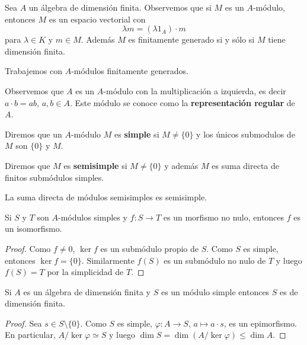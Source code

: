 Sea $A$ un álgebra de dimensión finita. Observemos
que si $M$ es un $A$-módulo, entonces $M$ es un espacio vectorial con 
\[
\lambda m=(\lambda 1_A)\cdot m
\]
para
$\lambda\in K$ y $m\in M$. 
Además $M$ es finitamente generado si y sólo si $M$ tiene dimensión finita. 

Trabajemos con $A$-módulos finitamente generados. 

Observemos que $A$ es un $A$-módulo con la multiplicación a izquierda, es decir $a\cdot b=ab$, $a,b\in A$.
Este módulo se conoce como la \textbf{representación regular} de $A$. 

\begin{definition}
Diremos que un $A$-módulo $M$ es
\textbf{simple} si $M\ne\{0\}$ y los únicos submodulos de $M$ son $\{0\}$ y $M$. 
\end{definition}

\begin{definition}
Diremos que $M$ es \textbf{semisimple} si $M\ne\{0\}$ y además $M$
es suma directa de finitos submódulos simples. 
\end{definition}

La suma directa de módulos semisimples es semisimple. 

\begin{lemma}[Schur]
Si $S$ y $T$ son $A$-módulos simples y $f\colon S\to T$ es un morfismo no nulo, entonces
$f$ es un isomorfismo. 	
\end{lemma}

\begin{proof}
Como $f\ne 0$, $\ker f$ es un submódulo propio de $S$. Como $S$ es simple, entonces $\ker f=\{0\}$. Similarmente $f(S)$ 
es un submódulo no nulo de $T$ y luego $f(S)=T$ por la simplicidad de $T$. 	
\end{proof}

\begin{proposition}
    Si $A$ es un álgebra de dimensión finita y $S$ es un módulo simple 
    entonces $S$ es de dimensión finita.
\end{proposition}

\begin{proof}
    Sea $s\in S\setminus\{0\}$. Como $S$ es simple, $\varphi\colon A\to S$, $a\mapsto a\cdot s$, es
    un epimorfismo. En particular, $A/\ker\varphi\simeq S$ y luego $\dim S=\dim (A/\ker\varphi)\leq \dim A$. 
\end{proof}

